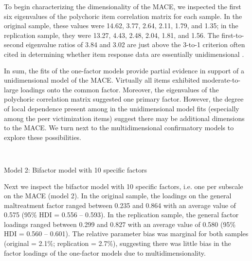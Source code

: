 \documentclass[letterpaper,man,natbib,noextraspace,floatsintext,longtable]{apa6}
\makeatletter
\renewcommand{\subsubsection}{\@startsection{subsubsection}{3}
  {\z@}%
  {\b@level@two@skip}{\e@level@two@skip}%
  {\normalfont\normalsize\bfseries}}
\makeatother
\begin{document}
To begin characterizing the dimensionality of the MACE, we inspected the first six eigenvalues of the polychoric item correlation matrix for each sample. In the original sample, these values were 14.62, 3.77, 2.64, 2.11, 1.79, and 1.35; in the replication sample, they were 13.27, 4.43, 2.48, 2.04, 1.81, and 1.56. The first-to-second eigenvalue ratios of 3.84 and 3.02 are just above the 3-to-1 criterion often cited in determining whether item response data are essentially unidimensional \citep{embretson2013item}. 

In sum, the fits of the one-factor models provide partial evidence in support of a unidimensional model of the MACE. Virtually all items exhibited moderate-to-large loadings onto the common factor. Moreover, the eigenvalues of the polychoric correlation matrix suggested one primary factor. However, the degree of local dependence present among in the unidimensional model fits (especially among the peer victimization items) suggest there may be additional dimensions to the MACE. We turn next to the multidimensional confirmatory models to explore these possibilities.

{\begin{spacing}{0.2} \hfill \\ \end{spacing}} \subsubsection{Model 2: Bifactor model with 10 specific factors}

Next we inspect the bifactor model with 10 specific factors, i.e. one per subscale on the MACE (model 2). In the original sample, the loadings on the general maltreatment factor ranged between 0.235 and 0.864 with an average value of 0.575 (95\% HDI = 0.556 -- 0.593). In the replication sample, the general factor loadings ranged between 0.299 and 0.827 with an average value of 0.580 (95\% HDI = 0.560 -- 0.601). The relative parameter bias was marginal for both samples (original = 2.1\%; replication = 2.7\%), suggesting there was little bias in the factor loadings of the one-factor models due to multidimensionality.  
\end{document}
